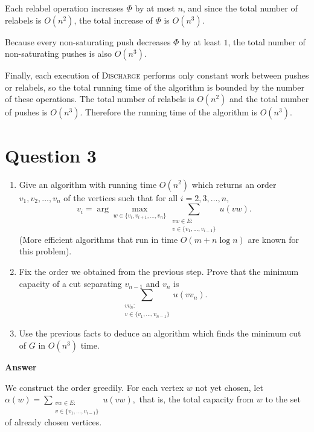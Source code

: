 \documentclass[letterpaper]{article}
\begin{document}
		Each relabel operation increases $\Phi$ by at most $n$, and since the
		total number of relabels is $O(n^2)$, the total increase of $\Phi$ is
		$O(n^3).$
		
		Because every non-saturating push decreases $\Phi$ by at least $1$, the
		total number of non-saturating pushes is also
		$O(n^3).$
		
		\medskip
		
		Finally, each execution of \textsc{Discharge} performs only constant work
		between pushes or relabels, so the total running time of the algorithm
		is bounded by the number of these operations. The total number of relabels is $O(n^2)$ and the total number of pushes
		is $O(n^3)$. Therefore the running time of the algorithm is
		$O(n^3).$

		
		\clearpage
		
		\section{Question 3}
		\begin{enumerate}
			\item[(a)] Give an algorithm with running time $O(n^2)$ which returns an order
			$v_1, v_2, \ldots, v_n$ of the vertices such that for all $i = 2,3,\ldots,n$,
			\[
			v_i
			=
			\arg\max_{w \in \{v_i,v_{i+1},\ldots,v_n\}}
			\sum_{\substack{vw \in E:\\ v \in \{v_1,\ldots,v_{i-1}\}}} u(vw).
			\]
			(More efficient algorithms that run in time $O(m + n\log n)$ are known for this problem).
			
			\item[(b)] Fix the order we obtained from the previous step. Prove that the minimum
			capacity of a cut separating $v_{n-1}$ and $v_n$ is
			\[
			\sum_{\substack{v v_n :\\ v \in \{v_1,\ldots,v_{n-1}\}}} u(vv_n).
			\]
			
			\item[(c)] Use the previous facts to deduce an algorithm which finds the minimum cut
			of $G$ in $O(n^3)$ time.
		\end{enumerate}
		
		
		\textbf{Answer}
		
		\item[(a)] We construct the order greedily. For each vertex $w$ not yet chosen, let
		$
		\alpha(w) = \sum_{\substack{vw \in E:\\ v \in \{v_1,\ldots,v_{i-1}\}}} u(vw),
		$
		that is, the total capacity from $w$ to the set of already chosen vertices.
		
\end{document}
